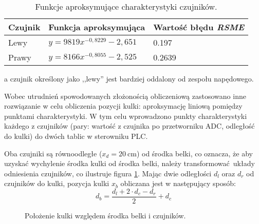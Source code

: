 \begin{table}[h]
    \centering
    \begin{threeparttable}
        \caption{Funkcje aproksymujące charakterystyki czujników.}
        \label{tab:aproksymacja_czujnikow}
        
        \begin{tabularx}{0.65\textwidth}{l | l | l}
            \toprule
            Czujnik & Funkcja aproksymująca & Wartość błędu \textit{RSME} \\
            \midrule
            Lewy\tnote{a}  & $y = 9819 x ^ {-0,8229} - {2,651} $ & \num{0,197} \\
            Prawy\tnote{a} & $y = 8166 x ^ {-0,8055} - {2,525} $ & \num{0,2639} \\
            \bottomrule
        \end{tabularx}
        
        \begin{tablenotes}
            \footnotesize
            \item[a] czujnik określony jako ,,lewy'' jest bardziej oddalony od zespołu napędowego.
        \end{tablenotes}
    \end{threeparttable}
\end{table}

Wobec utrudnień spowodowanych złożonością obliczeniową zastosowano inne rozwiązanie w celu obliczenia pozycji kulki: aproksymację liniową pomiędzy punktami charakterystyki. W tym celu wprowadzono punkty charakterystyki każdego z czujników (pary: wartość z czujnika po przetworniku ADC, odległość do kulki) do dwóch tablic w sterowniku PLC.

Oba czujniki są równoodległe ($x_d = \SI{20}{\centi\meter}$) od środka belki, co oznacza, że aby uzyskać wychylenie środka kulki od środka belki, należy transformować układy odniesienia czujników, co ilustruje figura \ref{fig:polozenie_kulki}. Mając dwie odległości $d_l$ oraz $d_r$ od czujników do kulki, pozycja kulki $x_b$ obliczana jest w następujący sposób:
\begin{equation}\label{eq:pozycja_kulki}
d_b = \frac{d_l + 2\cdot d_c - d_r}{2} + d_c
\end{equation}

\begin{figure}[H]
    \centering
    
    \caption{Położenie kulki względem środka belki i czujników.}
    \label{fig:polozenie_kulki}
\end{figure}


